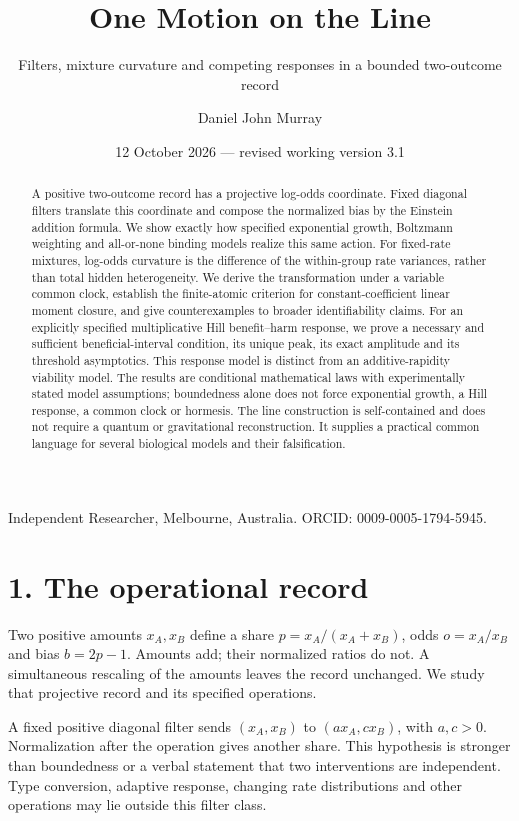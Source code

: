 \documentclass[
  11pt,
  a4paper,
]{article}
\title{One Motion on the Line}
\subtitle{Filters, mixture curvature and competing responses in a bounded two-outcome record}
\author{Daniel John Murray}
\date{12 October 2026 --- revised working version 3.1}
\begin{document}
\maketitle
\begin{abstract}
A positive two-outcome record has a projective log-odds coordinate. Fixed diagonal filters translate this coordinate and compose the normalized bias by the Einstein addition formula. We show exactly how specified exponential growth, Boltzmann weighting and all-or-none binding models realize this same action. For fixed-rate mixtures, log-odds curvature is the difference of the within-group rate variances, rather than total hidden heterogeneity. We derive the transformation under a variable common clock, establish the finite-atomic criterion for constant-coefficient linear moment closure, and give counterexamples to broader identifiability claims. For an explicitly specified multiplicative Hill benefit--harm response, we prove a necessary and sufficient beneficial-interval condition, its unique peak, its exact amplitude and its threshold asymptotics. This response model is distinct from an additive-rapidity viability model. The results are conditional mathematical laws with experimentally stated model assumptions; boundedness alone does not force exponential growth, a Hill response, a common clock or hormesis. The line construction is self-contained and does not require a quantum or gravitational reconstruction. It supplies a practical common language for several biological models and their falsification.
\end{abstract}

Independent Researcher, Melbourne, Australia. ORCID: 0009-0005-1794-5945.

\section{1. The operational record}\label{the-operational-record}

Two positive amounts \(x_A,x_B\) define a share \(p=x_A/(x_A+x_B)\), odds \(o=x_A/x_B\) and bias \(b=2p-1\). Amounts add; their normalized ratios do not. A simultaneous rescaling of the amounts leaves the record unchanged. We study that projective record and its specified operations.

A fixed positive diagonal filter sends \((x_A,x_B)\) to \((a x_A,c x_B)\), with \(a,c>0\). Normalization after the operation gives another share. This hypothesis is stronger than boundedness or a verbal statement that two interventions are independent. Type conversion, adaptive response, changing rate distributions and other operations may lie outside this filter class.
\end{document}
